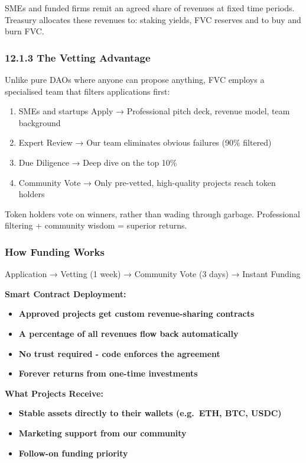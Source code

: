 \documentclass[
  paper=a4,
  ,captions=tableheading
]{scrartcl}
\providecommand{\tightlist}{%
  \setlength{\itemsep}{0pt}\setlength{\parskip}{0pt}}
\begin{document}
SMEs and funded firms remit an agreed share of revenues at fixed time periods. Treasury allocates these revenues to: staking yields, FVC reserves and to buy and burn FVC.

\subsubsection{12.1.3 The Vetting Advantage}\label{the-vetting-advantage}

Unlike pure DAOs where anyone can propose anything, FVC employs a
specialised team that filters applications first:

\begin{enumerate}
\def\labelenumi{\arabic{enumi}.}
\tightlist
\item
  SMEs and startups Apply → Professional
  pitch deck, revenue model, team background
\item
  Expert Review → Our team eliminates obvious failures (90\% filtered)
\item
  Due Diligence → Deep dive on the top 10\%
\item
  Community Vote → Only pre-vetted, high-quality projects reach token
  holders
\end{enumerate}

Token holders vote on winners, rather than wading through garbage.
Professional filtering + community wisdom = superior returns.

\subsubsection{How Funding Works}\label{how-funding-works}

Application → Vetting (1 week) → Community Vote (3 days) → Instant
Funding

\textbf{Smart Contract Deployment:}

\begin{itemize}
\tightlist
\item
  \textbf{Approved projects get custom revenue-sharing contracts}
\item
  \textbf{A percentage of all revenues flow back automatically}
\item
  \textbf{No trust required - code enforces the agreement}
\item
  \textbf{Forever returns from one-time investments}
\end{itemize}

\textbf{What Projects Receive:}

\begin{itemize}
\tightlist
\item
  \textbf{Stable assets directly to their wallets (e.g.~ETH, BTC, USDC)}
\item
  \textbf{Marketing support from our community}
\item
  \textbf{Follow-on funding priority}
\end{itemize}
\end{document}
